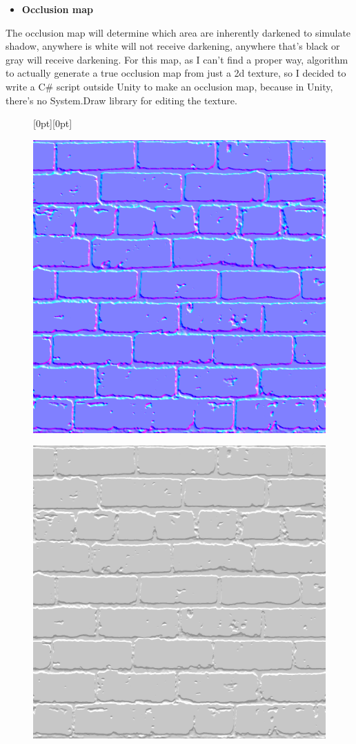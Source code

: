 \documentclass[a4paper, 13pt]{extarticle}
\begin{document}
{\begin{itemize}
	\item \bfseries Occlusion map	 	
\end{itemize}
The occlusion map will determine which area are inherently darkened to simulate shadow, anywhere is white will not receive darkening, anywhere that's black or gray will receive darkening. For this map, as I can't find a proper way, algorithm to actually generate a true occlusion map from just a 2d texture, so I decided to write a C\# script outside Unity to make an occlusion map, because in Unity, there's no System.Draw library for editing the texture.
\newpage
\begin{figure}[h]
	\centering
	\raisebox{-25mm}[0pt][0pt]{
		\begin{minipage}{.4\textwidth}
			\centering
			\includegraphics[width=0.8\linewidth]{intructions/Brick001_n.png}
			\centering
			\label{fig:test22}
		\end{minipage}
		\begin{minipage}{.4\textwidth}
			\centering
			\includegraphics[width=0.8\linewidth]{intructions/Brick001_occ.png}

\end{minipage}}
\end{figure}}
\end{document}
